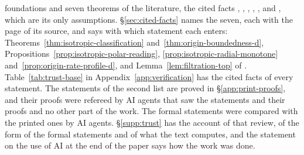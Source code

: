 foundations and seven theorems of the literature, the cited facts , ,
, , ,  and , which are its only
assumptions. \S\ref{sec:cited-facts} names the seven, each with the page of its source, and
says with which statement each enters: Theorems~\ref{thm:isotropic-classification}
and~\ref{thm:origin-boundedness-d}, Propositions~\ref{prop:isotropic-polar-reading},
\ref{prop:isotropic-radial-monotone} and~\ref{prop:origin-rate-profile-d}, and
Lemma~\ref{lem:filtration-top} of \suppl.
Table~\ref{tab:trust-base} in
Appendix~\ref{app:verification} has the cited facts of every statement. The statements of the second list are proved in
\S\ref{app:print-proofs}, and their proofs were refereed by AI agents that saw the statements
and their proofs and no other part of the work. The formal statements were compared with the
printed ones by AI agents. \S\ref{supp:trust} has the account of that review, of the form of
the formal statements and of what the text computes, and the statement on the use of AI at the
end of the paper says how the work was done.
